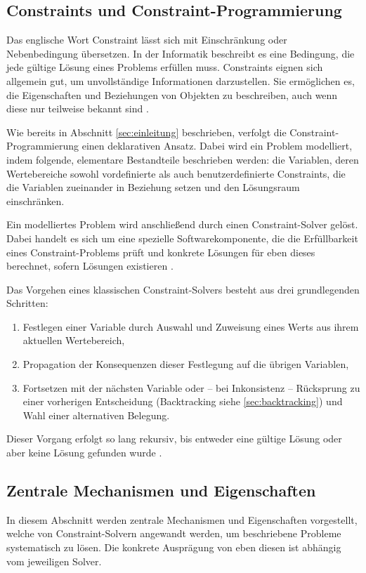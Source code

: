 \documentclass[12pt,a4paper]{article}
\begin{document}
\subsection{Constraints und Constraint-Programmierung}
Das englische Wort \glqq Constraint\grqq{} lässt sich mit Einschränkung oder Nebenbedingung übersetzen.
In der Informatik beschreibt es eine Bedingung, die jede gültige Lösung eines Problems erfüllen muss.
Constraints eignen sich allgemein gut, um unvollständige Informationen darzustellen.
Sie ermöglichen es, die Eigenschaften und Beziehungen von Objekten zu beschreiben, auch wenn diese nur teilweise bekannt sind \cite{clp_book}.

Wie bereits in Abschnitt \ref{sec:einleitung} beschrieben, verfolgt die Constraint-Programmierung einen deklarativen Ansatz.
Dabei wird ein Problem modelliert, indem folgende, elementare Bestandteile beschrieben werden: die Variablen, deren Wertebereiche sowohl vordefinierte als auch benutzerdefinierte Constraints, die die Variablen zueinander in Beziehung setzen und den Lösungsraum einschränken.

Ein modelliertes Problem wird anschließend durch einen Constraint-Solver gelöst.
Dabei handelt es sich um eine spezielle Softwarekomponente, die die Erfüllbarkeit eines Constraint-Problems prüft und konkrete Lösungen für eben dieses berechnet, sofern Lösungen existieren \cite{drt,clp_book2}.

\noindent
Das Vorgehen eines klassischen Constraint-Solvers besteht aus drei grundlegenden Schritten:
\begin{enumerate}
    \item Festlegen einer Variable durch Auswahl und Zuweisung eines Werts aus ihrem aktuellen Wertebereich,
    \item Propagation der Konsequenzen dieser Festlegung auf die übrigen Variablen,
    \item Fortsetzen mit der nächsten Variable oder -- bei Inkonsistenz -- Rücksprung zu einer vorherigen Entscheidung (Backtracking siehe \ref{sec:backtracking}) und Wahl einer alternativen Belegung.
\end{enumerate}
Dieser Vorgang erfolgt so lang rekursiv, bis entweder eine gültige Lösung oder aber keine Lösung gefunden wurde \cite{clp_book2}.
\subsection{Zentrale Mechanismen und Eigenschaften}
In diesem Abschnitt werden zentrale Mechanismen und Eigenschaften vorgestellt, welche von Constraint-Solvern angewandt werden, um beschriebene Probleme systematisch zu lösen. 
Die konkrete Ausprägung von eben diesen ist abhängig vom jeweiligen Solver.
\end{document}
